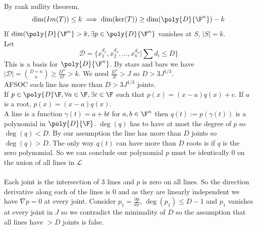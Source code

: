 \documentclass[a4paper]{article}
\begin{document}
By rank nullity theorem, $$\dim(Im(T))\leq k\implies \dim(\ker (T))\geq \dim(\poly{D}{\F^n})-k$$
If $\dim(\poly{D}{\F^n}>k, \exists p\in \poly{D}{\F^n}$ vanishes at $S$, $|S|=k$.\\
Let $$\mathcal{D}=\{x_1^{d_1},x_2^{d_2},...,x_n^{d_n}|\sum d_i\leq D\}$$ This is a basis for $\poly{D}{\F^n}$. By stars and bars we have $|\mathcal{D}|={D+n \choose n}\geq \frac{D^n}{n!}>k.$ 
We need $\frac{D^3}{3!}>J$ so $D>3J^{1/3}.$\\
AFSOC each line has more than $D>3J^{1/3}$ joints.\\
If $p\in \poly{D}\F, \forall a \in \F, \exists c \in \F$ such that $p(x)=(x-a)q(x)+c.$ If $a$ is a root, $p(x)=(x-a)q(x).$ \\A line is a function $\gamma(t)=a+bt$ for $a,b\in \F^n$ then $q(t):=p(\gamma(t))$ is a polynomial in $\poly{D}{\F}$. $\deg(q)$ has to have at most the degree of $p$ so $\deg(q)<D.$ By our assumption the line has more than $D$ joints so $\deg(q)>D.$ The only way $q(t)$ can have more than $D$ roots is if $q$ is the zero polynomial. So we can conclude our polynomial $p$ must be identically $0$ on the union of all lines in $\mathcal{L}$\\\\
Each joint is the intersection of $3$ lines and $p$ is zero on all lines. So the direction derivative along each of the lines is $0$ and as they are linearly independent we have $\nabla p=0$ at every joint. Consider $p_1=\frac{\partial p}{dx}$, $\deg(p_1)\leq D-1$ and $p_1$ vanishes at every joint in $J$ so we contradict the minimality of $D$ so the assumption that all lines have $>D$ joints is false. 
\end{document}
